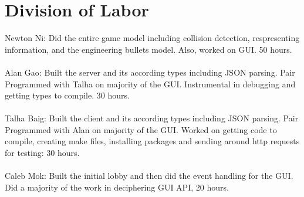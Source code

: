 \documentclass{article}
\begin{document}
 \section{Division of Labor}
 
Newton Ni: Did the entire game model including collision detection, respresenting information, and the engineering bullets model. Also, worked on GUI. 50 hours. \\
\\ 
Alan Gao: Built the server and its according types including JSON parsing. Pair Programmed with Talha on majority of the GUI. Instrumental in debugging and getting types to compile. 30 hours.
 \\ \\
 Talha Baig: Built the client and its according types including JSON parsing. Pair Programmed with Alan on majority of the GUI. Worked on getting code to compile, creating make files, installing packages and sending around http requests for testing: 30 hours.
 \\  \\
 Caleb Mok: Built the initial lobby and then did the event handling for the GUI. Did a majority of the work in deciphering GUI API, 20 hours.
\end{document}
